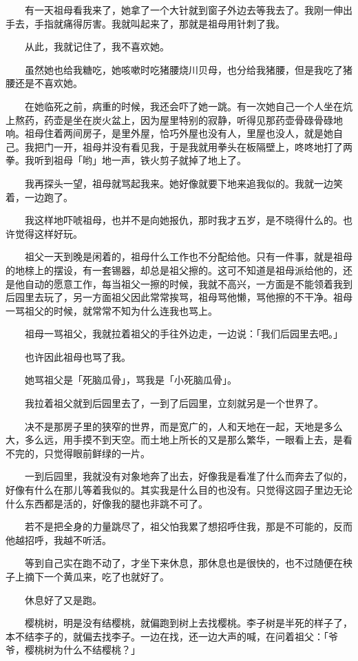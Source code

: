 \documentclass[UTF8]{ctexart}
\begin{document}
　　有一天祖母看我来了，她拿了一个大针就到窗子外边去等我去了。我刚一伸出手去，手指就痛得厉害。我就叫起来了，那就是祖母用针刺了我。

　　从此，我就记住了，我不喜欢她。

　　虽然她也给我糖吃，她咳嗽时吃猪腰烧川贝母，也分给我猪腰，但是我吃了猪腰还是不喜欢她。

　　在她临死之前，病重的时候，我还会吓了她一跳。有一次她自己一个人坐在炕上熬药，药壶是坐在炭火盆上，因为屋里特别的寂静，听得见那药壶骨碌骨碌地响。祖母住着两间房子，是里外屋，恰巧外屋也没有人，里屋也没人，就是她自己。我把门一开，祖母并没有看见我，于是我就用拳头在板隔壁上，咚咚地打了两拳。我听到祖母「哟」地一声，铁火剪子就掉了地上了。

　　我再探头一望，祖母就骂起我来。她好像就要下地来追我似的。我就一边笑着，一边跑了。

　　我这样地吓唬祖母，也并不是向她报仇，那时我才五岁，是不晓得什么的。也许觉得这样好玩。

　　祖父一天到晚是闲着的，祖母什么工作也不分配给他。只有一件事，就是祖母的地榇上的摆设，有一套锡器，却总是祖父擦的。这可不知道是祖母派给他的，还是他自动的愿意工作，每当祖父一擦的时候，我就不高兴，一方面是不能领着我到后园里去玩了，另一方面祖父因此常常挨骂，祖母骂他懒，骂他擦的不干净。祖母一骂祖父的时候，就常常不知为什么连我也骂上。

　　祖母一骂祖父，我就拉着祖父的手往外边走，一边说：「我们后园里去吧。」

　　也许因此祖母也骂了我。

　　她骂祖父是「死脑瓜骨」，骂我是「小死脑瓜骨」。

　　我拉着祖父就到后园里去了，一到了后园里，立刻就另是一个世界了。

　　决不是那房子里的狭窄的世界，而是宽广的，人和天地在一起，天地是多么大，多么远，用手摸不到天空。而土地上所长的又是那么繁华，一眼看上去，是看不完的，只觉得眼前鲜绿的一片。

　　一到后园里，我就没有对象地奔了出去，好像我是看准了什么而奔去了似的，好像有什么在那儿等着我似的。其实我是什么目的也没有。只觉得这园子里边无论什么东西都是活的，好像我的腿也非跳不可了。

　　若不是把全身的力量跳尽了，祖父怕我累了想招呼住我，那是不可能的，反而他越招呼，我越不听活。

　　等到自己实在跑不动了，才坐下来休息，那休息也是很快的，也不过随便在秧子上摘下一个黄瓜来，吃了也就好了。

　　休息好了又是跑。

　　樱桃树，明是没有结樱桃，就偏跑到树上去找樱桃。李子树是半死的样子了，本不结李子的，就偏去找李子。一边在找，还一边大声的喊，在问着祖父：「爷爷，樱桃树为什么不结樱桃？」
\end{document}
